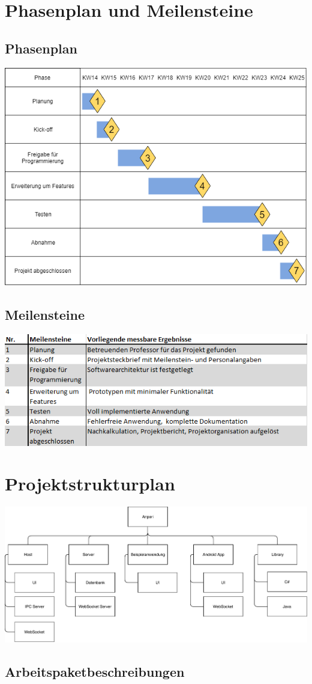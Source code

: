 \documentclass{scrartcl}
\begin{document}
\section{Phasenplan und Meilensteine}
\subsection{Phasenplan}
\includegraphics[scale=0.75]{Phasen.png}
\subsection{Meilensteine}
\includegraphics[scale=0.75]{Meilensteine.png}
\section{Projektstrukturplan}
\includegraphics[scale=0.75]{PSP.pdf}
\subsection{Arbeitspaketbeschreibungen}
\end{document}
